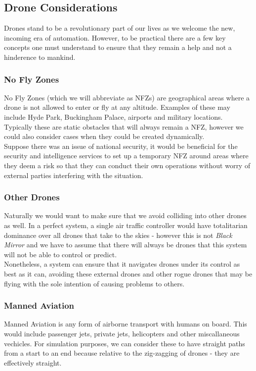 \documentclass[a4paper,12pt,titlepage]{article}
\begin{document}
\subsection{Drone Considerations}
Drones stand to be a revolutionary part of our lives as we welcome the new, incoming era of automation. However, to be practical there are a few key concepts one must understand to ensure that they remain a help and not a hinderence to mankind.

\subsubsection{No Fly Zones}
No Fly Zones (which we will abbreviate as NFZs) are geographical areas where a drone is not allowed to enter or fly at any altitude. Examples of these may include Hyde Park, Buckingham Palace, airports and military locations. Typically these are static obstacles that will always remain a NFZ, however we could also consider cases when they could be created dynamically.\\

Suppose there was an issue of national security, it would be beneficial for the security and intelligence services to set up a temporary NFZ around areas where they deem a risk so that they can conduct their own operations without worry of external parties interfering with the situation.

\subsubsection{Other Drones}
Naturally we would want to make sure that we avoid colliding into other drones as well. In a perfect system, a single air traffic controller would have totalitarian dominance over all drones that take to the skies - however this is not \textit{Black Mirror} and we have to assume that there will always be drones that this system will not be able to control or predict. \\

Nonetheless, a system can ensure that it navigates drones under its control as best as it can, avoiding these external drones and other rogue drones that may be flying with the sole intention of causing problems to others.

\subsubsection{Manned Aviation}
Manned Aviation is any form of airborne transport with humans on board. This would include passenger jets, private jets, helicopters and other miscallaneous vechicles. For simulation purposes, we can consider these to have straight paths from a start to an end because relative to the zig-zagging of drones - they are effectively straight. \\
\end{document}
